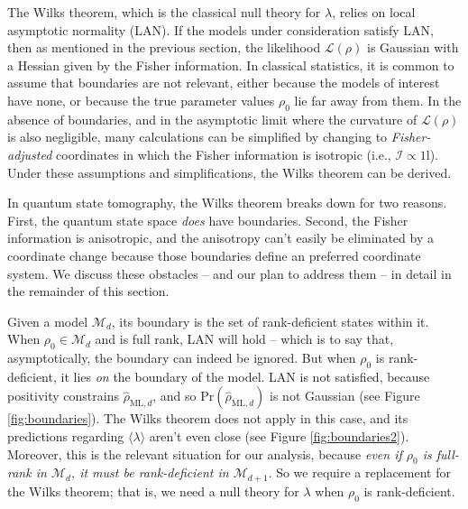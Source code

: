 \documentclass[aps,pra, twocolumn]{revtex4-1}
\newcommand{\M}{\mathcal{M}}
\newcommand{\Id}{\mathbb{I}}
\def\Id{1\!\mathrm{l}}
\newcommand{\rhohat}{\hat{\rho}}
\newcommand{\rhoML}[1]{\rhohat_{\scriptscriptstyle{\mathrm{ML},#1}}}
\begin{document}
The Wilks theorem, which is the classical null theory for $\lambda$, relies on local asymptotic normality (LAN). If the models under consideration satisfy LAN, then as mentioned in the previous section, the likelihood $\mathcal{L}(\rho)$ is Gaussian with a Hessian given by the Fisher information. In classical statistics, it is common to assume that boundaries are not relevant, either because the models of interest have none, or because the true parameter values $\rho_{0}$ lie far away from them.  In the absence of boundaries, and in the asymptotic limit where the curvature of $\mathcal{L}(\rho)$ is also negligible, many calculations can be simplified by changing to \emph{Fisher-adjusted} coordinates in which the Fisher information is isotropic (i.e., $\mathcal{I}\propto\Id$). Under these assumptions and simplifications, the Wilks theorem can be derived.

In quantum state tomography, the Wilks theorem breaks down for two reasons. First, the quantum state space \emph{does} have boundaries.  Second, the Fisher information is anisotropic, and the anisotropy can't easily be eliminated by a coordinate change because those boundaries define an preferred coordinate system. We discuss these obstacles -- and our plan to address them -- in detail in the remainder of this section.

Given a model $\M_{d}$, its boundary is the set of rank-deficient states within it. When $\rho_{0}\in \M_{d}$ and is full rank, LAN will hold -- which is to say that, asymptotically, the boundary can indeed be ignored. But when $\rho_{0}$ is rank-deficient, it lies \emph{on} the boundary of the model.  LAN is not satisfied, because positivity constrains $\rhoML{d}$, and so $\mathrm{Pr}(\rhoML{d})$ is not Gaussian (see Figure \ref{fig:boundaries}). The Wilks theorem does not apply in this case, and its predictions regarding $\langle \lambda \rangle$ aren't even close (see Figure \ref{fig:boundaries2}). Moreover, this is the relevant situation for our analysis, because \emph{even if $\rho_{0}$ is full-rank in $\M_{d}$, it must be rank-deficient in $\M_{d+1}$}. So we require a replacement for the Wilks theorem; that is, we need a null theory for $\lambda$ when $\rho_0$ is rank-deficient.
\end{document}
